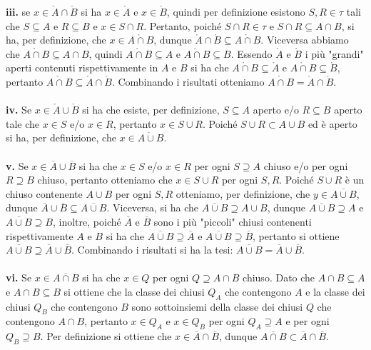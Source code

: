 \documentclass[oneside, 11pt]{amsbook}
\makeatletter
\newcommand{\0}{{(0)}}
\newcommand{\3}{{(3)}}
\theoremstyle{colonplain}
\theoremstyle{colondefinition}
\theoremstyle{colonremark}
\numberwithin{equation}{chapter}
\renewcommand{\proofname}{Dimostrazione}
\renewenvironment{proof}[1][\proofname]{\par
  \pushQED{\qed}%
  \normalfont \topsep6\p@\@plus6\p@\relax
  \trivlist
  \item[\hskip\labelsep\bfseries #1:]\ignorespaces
}{%
  \popQED\endtrivlist\@endpefalse
}
\makeatother
\begin{document}
\begin{proof}
\textbf{iii.} se $x \in \mathring{A} \cap \mathring{B}$ si ha $x \in \mathring{A}$ e $x \in \mathring{B}$, quindi per definizione esistono $S, R \in \tau$ tali che $S \subseteq A$ e $R \subseteq B$ e $x \in S \cap R$. Pertanto, poiché $S \cap R \in \tau$ e $S \cap R \subseteq A \cap B$, si ha, per definizione, che $x \in \mathring{A \cap B}$, dunque $\mathring{A} \cap \mathring{B} \subseteq \mathring{A \cap B}$. Viceversa abbiamo che $\mathring{A \cap B} \subseteq A \cap B$, quindi $\mathring{A \cap B} \subseteq A$ e $\mathring{A \cap B} \subseteq B$. Essendo $\mathring{A}$ e $\mathring{B}$ i più "grandi" aperti contenuti rispettivamente in $A$ e $B$ si ha che $\mathring{A \cap B} \subseteq \mathring{A}$ e $\mathring{A \cap B} \subseteq \mathring{B}$, pertanto $\mathring{A \cap B} \subseteq \mathring{A} \cap \mathring{B}$. Combinando i risultati otteniamo $\mathring{A \cap B} = \mathring{A} \cap \mathring{B}$. \\ \\
\textbf{iv.} Se $x \in \mathring{A} \cup \mathring{B}$ si ha che esiste, per definizione, $S \subseteq A$ aperto e/o $R \subseteq B$ aperto tale che $x \in S$ e/o $x \in R$, pertanto $x \in S \cup R$. Poiché $S \cup R \subset A \cup B$ ed è aperto si ha, per definizione, che $x \in \mathring{A \cup B}$. \\ \\
\textbf{v.} Se $x \in \overline{A} \cup \overline{B}$ si ha che $x \in S$ e/o $x \in R$ per ogni $S \supseteq A$ chiuso e/o per ogni $R \supseteq B$ chiuso, pertanto otteniamo che $x \in S \cup R$ per ogni $S, R$. Poiché $S \cup R$ è un chiuso contenente $A \cup B$ per ogni $S, R$ otteniamo, per definizione, che $y \in \overline{A \cup B}$, dunque $\overline{A} \cup \overline{B} \subseteq \overline{A \cup B}$. Viceversa, si ha che $\overline{A \cup B} \supseteq A \cup B$, dunque $\overline{A \cup B} \supseteq A$ e $\overline{A \cup B} \supseteq B$, inoltre, poiché $\overline{A}$ e $\overline{B}$ sono i più "piccoli" chiusi contenenti rispettivamente $A$ e $B$ si ha che $\overline{A \cup B} \supseteq \overline{A}$ e $\overline{A \cup B} \supseteq \overline{B}$, pertanto si ottiene $\overline{A \cup B} \supseteq \overline{A} \cup \overline{B}$. Combinando i risultati si ha la tesi: $\overline{A \cup B} = \overline{A} \cup \overline{B}$. \\ \\
\textbf{vi.} Se $x \in \overline{A \cap B}$ si ha che $x \in Q$ per ogni $Q \supseteq A \cap B$ chiuso. Dato che $A \cap B \subseteq A$ e $A \cap B \subseteq B$ si ottiene che la classe dei chiusi $Q_A$ che contengono $A$ e la classe dei chiusi $Q_B$ che contengono $B$ sono sottoinsiemi della classe dei chiusi $Q$ che contengono $A \cap B$, pertanto $x \in Q_A$ e $x \in Q_B$ per ogni $Q_A \supseteq A$ e per ogni $Q_B \supseteq B$. Per definizione si ottiene che $x \in \overline{A} \cap \overline{B}$, dunque $\overline{A \cap B} \subset \overline{A} \cap \overline{B}$. \\ \\

\end{proof}
\end{document}
